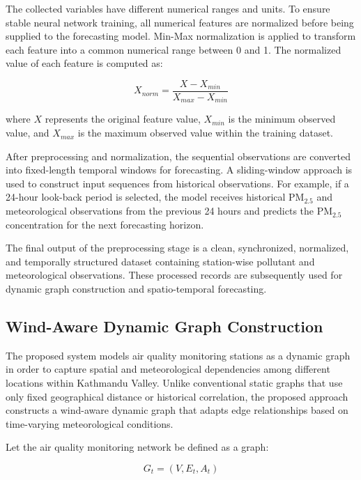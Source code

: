 The collected variables have different numerical ranges and units. To ensure stable neural network training, all numerical features are normalized before being supplied to the forecasting model. Min-Max normalization is applied to transform each feature into a common numerical range between 0 and 1. The normalized value of each feature is computed as:

\begin{equation}
X_{norm} = \frac{X - X_{min}}{X_{max} - X_{min}}
\end{equation}

where $X$ represents the original feature value, $X_{min}$ is the minimum observed value, and $X_{max}$ is the maximum observed value within the training dataset.

After preprocessing and normalization, the sequential observations are converted into fixed-length temporal windows for forecasting. A sliding-window approach is used to construct input sequences from historical observations. For example, if a 24-hour look-back period is selected, the model receives historical PM$_{2.5}$ and meteorological observations from the previous 24 hours and predicts the PM$_{2.5}$ concentration for the next forecasting horizon.

The final output of the preprocessing stage is a clean, synchronized, normalized, and temporally structured dataset containing station-wise pollutant and meteorological observations. These processed records are subsequently used for dynamic graph construction and spatio-temporal forecasting.

\subsection{Wind-Aware Dynamic Graph Construction}

The proposed system models air quality monitoring stations as a dynamic graph in order to capture spatial and meteorological dependencies among different locations within Kathmandu Valley. Unlike conventional static graphs that use only fixed geographical distance or historical correlation, the proposed approach constructs a wind-aware dynamic graph that adapts edge relationships based on time-varying meteorological conditions.

Let the air quality monitoring network be defined as a graph:

\begin{equation}
G_t = (V, E_t, A_t)
\end{equation}


